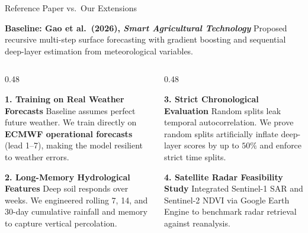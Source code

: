 \documentclass[aspectratio=169, 10pt]{beamer}
\begin{document}
\begin{frame}{Reference Paper vs.\ Our Extensions}
    \begin{block}{\textbf{Baseline: Gao et al.\ (2026), \textit{Smart Agricultural Technology}}}
        \footnotesize
        Proposed recursive multi-step surface forecasting with gradient boosting and sequential deep-layer estimation from meteorological variables.
    \end{block}

    \vspace{0.1cm}
    \begin{columns}[t]
        \begin{column}{0.48\textwidth}
            \begin{exampleblock}{\textbf{1. Training on Real Weather Forecasts}}
                \footnotesize
                Baseline assumes perfect future weather. We train directly on \textbf{ECMWF operational forecasts} (lead 1--7), making the model resilient to weather errors.
            \end{exampleblock}
            \vspace{0.1cm}
            \begin{exampleblock}{\textbf{2. Long-Memory Hydrological Features}}
                \footnotesize
                Deep soil responds over weeks. We engineered rolling 7, 14, and 30-day cumulative rainfall and memory to capture vertical percolation.
            \end{exampleblock}
        \end{column}
        \begin{column}{0.48\textwidth}
            \begin{exampleblock}{\textbf{3. Strict Chronological Evaluation}}
                \footnotesize
                Random splits leak temporal autocorrelation. We prove random splits artificially inflate deep-layer scores by up to $50\%$ and enforce strict time splits.
            \end{exampleblock}
            \vspace{0.1cm}
            \begin{exampleblock}{\textbf{4. Satellite Radar Feasibility Study}}
                \footnotesize
                Integrated Sentinel-1 SAR and Sentinel-2 NDVI via Google Earth Engine to benchmark radar retrieval against reanalysis.
            \end{exampleblock}
        \end{column}
    \end{columns}
\end{frame}
\end{document}
